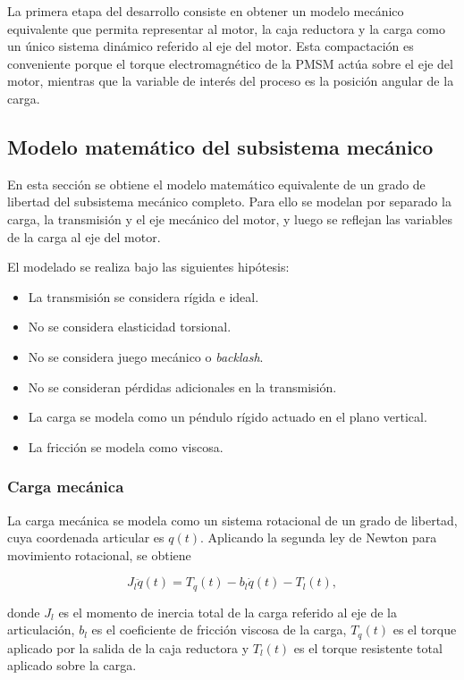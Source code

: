\documentclass[10pt,a4paper]{article}
\begin{document}
La primera etapa del desarrollo consiste en obtener un modelo mecánico equivalente que permita representar al motor, la caja reductora y la carga como un único sistema dinámico referido al eje del motor. Esta compactación es conveniente porque el torque electromagnético de la PMSM actúa sobre el eje del motor, mientras que la variable de interés del proceso es la posición angular de la carga.

\subsection{Modelo matemático del subsistema mecánico}

En esta sección se obtiene el modelo matemático equivalente de un grado de libertad del subsistema mecánico completo. Para ello se modelan por separado la carga, la transmisión y el eje mecánico del motor, y luego se reflejan las variables de la carga al eje del motor.

El modelado se realiza bajo las siguientes hipótesis:

\begin{itemize}[leftmargin=*]
    \item La transmisión se considera rígida e ideal.
    \item No se considera elasticidad torsional.
    \item No se considera juego mecánico o \textit{backlash}.
    \item No se consideran pérdidas adicionales en la transmisión.
    \item La carga se modela como un péndulo rígido actuado en el plano vertical.
    \item La fricción se modela como viscosa.
\end{itemize}

\subsubsection{Carga mecánica}

La carga mecánica se modela como un sistema rotacional de un grado de libertad, cuya coordenada articular es \(q(t)\). Aplicando la segunda ley de Newton para movimiento rotacional, se obtiene

\begin{equation}
    J_l \ddot{q}(t)
    =
    T_q(t)
    -
    b_l \dot{q}(t)
    -
    T_l(t),
    \label{eq:carga_mecanica}
\end{equation}

donde \(J_l\) es el momento de inercia total de la carga referido al eje de la articulación, \(b_l\) es el coeficiente de fricción viscosa de la carga, \(T_q(t)\) es el torque aplicado por la salida de la caja reductora y \(T_l(t)\) es el torque resistente total aplicado sobre la carga.
\end{document}
